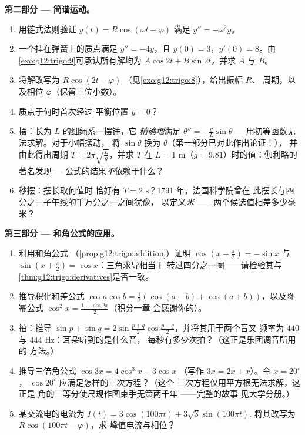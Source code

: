 \begin{problem}
\medskip
\noindent\textbf{第二部分 --- 简谐运动。}
\begin{enumerate}[resume]
  \item 用链式法则验证
        $y(t) = R\cos(\omega t - \varphi)$ 满足
        $y'' = -\omega^2 y$。
  \item 一个挂在弹簧上的质点满足 $y'' = -4y$，且
        $y(0) = 3$，$y'(0) = 8$。由
        \cref{exo:g12:trigo:9}可承认所有解均为
        $A\cos 2t + B\sin 2t$，并求 $A$ 与 $B$。
  \item 将解改写为 $R\cos(2t - \varphi)$
        （见\cref{exo:g12:trigo:8}），给出振幅 $R$、
        周期，以及相位 $\varphi$（保留三位小数）。
  \item 质点于何时首次经过
        平衡位置 $y = 0$？
  \item 摆：长为 $L$ 的细绳系一摆锤，它
        \emph{精确地}满足 $\theta'' = -\frac gL \sin\theta$ ---
        用初等函数无法求解。对于小幅摆动，
        将 $\sin\theta$ 换为 $\theta$（第一部分已对此作出论证！），
        并由此得出周期
        $T = 2\pi\sqrt{\frac Lg}$，并求 $T$ 在
        $L = 1$ m（$g = 9.81$）时的值：伽利略的著名发现 ---
        公式的结果\emph{不}依赖于什么？
  \item 秒摆：摆长取何值时
        恰好有 $T = 2$ s？1791 年，法国科学院曾在
        此摆长与四分之一子午线的千万分之一之间犹豫，
        以定义\emph{米}——
        两个候选值相差多少毫米？
\end{enumerate}

\medskip
\noindent\textbf{第三部分 --- 和角公式的应用。}
\begin{enumerate}[resume]
  \item 利用和角公式
        （\cref{prop:g12:trigo:addition}）证明
        $\cos\left(x + \frac\pi2\right) = -\sin x$ 与
        $\sin\left(x + \frac\pi2\right) = \cos x$：三角求导相当于
        转过四分之一圈——请检验其与
        \cref{thm:g12:trigo:derivatives}是否一致。
  \item 推导积化和差公式
        $\cos a \cos b = \frac12\left(\cos(a - b) +
        \cos(a + b)\right)$，以及降幂公式
        $\cos^2 x = \frac{1 + \cos 2x}{2}$（积分一章
        会感谢你的）。
  \item 拍：推导
        $\sin p + \sin q = 2 \sin\frac{p + q}{2}
        \cos\frac{p - q}{2}$，并将其用于两个音叉
        频率为 $440$ 与 $444$ Hz：耳朵听到的是什么音，
        每秒有多少次拍？（这正是乐团调音所用的
        方法。）
  \item 推导三倍角公式
        $\cos 3x = 4\cos^3 x - 3\cos x$
        （写作 $3x = 2x + x$）。令 $x = 20^\circ$，
        $\cos 20^\circ$ 应满足怎样的三次方程？（这个
        三次方程仅用平方根无法求解，这正是
        角的三等分使尺规作图束手无策两千年
        ——完整的故事
        见大学分册。）
  \item 某交流电的电流为
        $I(t) = 3\cos(100\pi t) + 3\sqrt3 \sin(100\pi t)$.
        将其改写为 $R\cos(100\pi t - \varphi)$，求
        峰值电流与相位？
\end{enumerate}


\end{problem}
